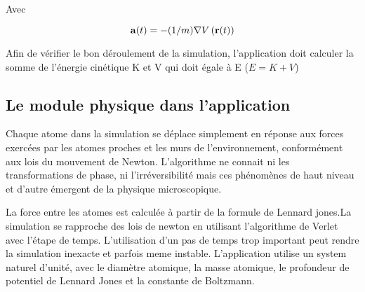 Avec

\begin{displaymath} {\bf a} (t) = - (1/m) {\bf\nabla} V\left( {\bf r}(t) \right) \end{displaymath}

Afin de vérifier le bon déroulement de la simulation, l'application doit calculer la somme de l'énergie cinétique K et  V qui doit égale à E  ($ E = K + V $)
\subsection{Le module physique dans l'application}
Chaque atome dans la simulation se déplace simplement en réponse aux forces exercées par les atomes proches et les murs de l'environnement, conformément aux lois du mouvement de Newton. L'algorithme ne connait ni les transformations de phase, ni l'irréversibilité mais ces phénomènes de haut niveau et d'autre émergent de la physique microscopique.

La force entre les atomes est calculée à partir de la formule de Lennard jones.La simulation se rapproche des lois de newton en utilisant l'algorithme de Verlet avec l'étape de temps. L'utilisation d'un pas de temps trop important peut rendre la simulation inexacte et parfois meme instable.
L'application utilise un system naturel d'unité, avec le diamètre atomique, la masse atomique, le profondeur de potentiel de Lennard Jones et la constante de Boltzmann.
